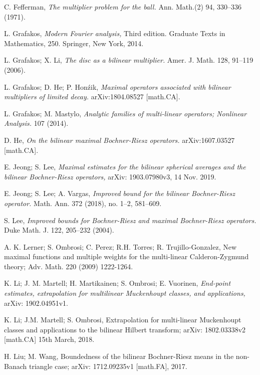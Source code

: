 \documentclass[a4paper,12pt]{amsart}
\begin{document}
\begin{thebibliography}{99}
 C. Fefferman, {\it The multiplier problem for the ball.} Ann. Math.(2) 94, 330--336 (1971).

 L. Grafakos, {\it Modern Fourier analysis,} Third edition. Graduate Texts in Mathematics, 250. Springer, New York, 2014. 

 L. Grafakos; X. Li, {\it  The disc as a bilinear multiplier.} Amer. J. Math. 128, 91--119 (2006).

 L. Grafakos; D. He; P. Hon\'{z}ik,  {\it Maximal operators associated with bilinear multipliers of limited decay.}  arXiv:1804.08527 [math.CA].

 L. Grafakos; M. Mastylo, {\it  Analytic families of multi-linear operators; Nonlinear Analysis.} 107 (2014).

 D. He, {\it On the bilinear maximal Bochner-Riesz operators.} arXiv:1607.03527 [math.CA].

 E. Jeong; S. Lee, {\it Maximal estimates for the bilinear spherical averages and the bilinear Bochner-Riesz operators,} arXiv: 1903.07980v3, 14 Nov. 2019.

 E. Jeong; S. Lee; A. Vargas, {\it Improved bound for the bilinear Bochner-Riesz operator.} Math. Ann. 372 (2018), no. 1--2, 581--609.


 S. Lee, {\it Improved bounds for Bochner-Riesz and maximal Bochner-Riesz operators.} Duke Math. J. 122, 205--232 (2004).

 A. K. Lerner; S. Ombrosi; C. Perez; R.H. Torres; R. Trujillo-Gonzalez, New maximal functions and multiple weights for the multi-linear Calderon-Zygmund theory; Adv. Math. 220 (2009) 1222-1264.

 K. Li; J. M. Martell; H. Martikainen; S. Ombrosi; E. Vuorinen, {\it End-point estimates, extrapolation for multilinear Muckenhoupt classes, and applications,} arXiv: 1902.04951v1.

 K. Li; J.M. Martell; S. Ombrosi, Extrapolation for multi-linear Muckenhoupt classes and applications to the bilinear Hilbert transform; arXiv: 1802.03338v2 [math.CA] 15th March, 2018.


 H. Liu; M. Wang, Boundedness of the bilinear Bochner-Riesz means in the non-Banach triangle case; arXiv: 1712.09235v1 [math.FA], 2017.  


\end{thebibliography}
\end{document}
